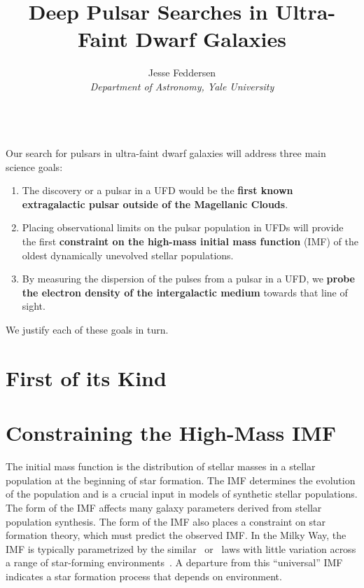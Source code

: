 \documentclass[preprint]{/Users/jesse/tex/aastex_JRF}
\begin{document}
\title{Deep Pulsar Searches in Ultra-Faint Dwarf Galaxies}
\author{Jesse Feddersen\\ \emph{Department of Astronomy, Yale University}\\~\\}

\maketitle 


Our search for pulsars in ultra-faint dwarf galaxies will address three main science goals:
\begin{enumerate}
\item The discovery or a pulsar in a UFD would be the \textbf{first known extragalactic pulsar outside of the Magellanic Clouds}.
\item Placing observational limits on the pulsar population in UFDs will provide the first \textbf{constraint on the high-mass initial mass function} (IMF) of the oldest dynamically unevolved stellar populations.
\item By measuring the dispersion of the pulses from a pulsar in a UFD, we \textbf{probe the electron density of the intergalactic medium} towards that line of sight.
\end{enumerate}
We justify each of these goals in turn.

\section{First of its Kind}


\section{Constraining the High-Mass IMF}
The initial mass function is the distribution of stellar masses in a stellar population at the beginning of star formation. The IMF determines the evolution of the population and is a crucial input in models of synthetic stellar populations. The form of the IMF affects many galaxy parameters derived from stellar population synthesis. The form of the IMF also places a constraint on star formation theory, which must predict the observed IMF. In the Milky Way, the IMF is typically parametrized by the similar~\citet{Kroupa01} or~\citet{Chabrier03} laws with little variation across a range of star-forming environments~\citep{Bastian10}. A departure from this ``universal'' IMF indicates a star formation process that depends on environment.
\end{document}
